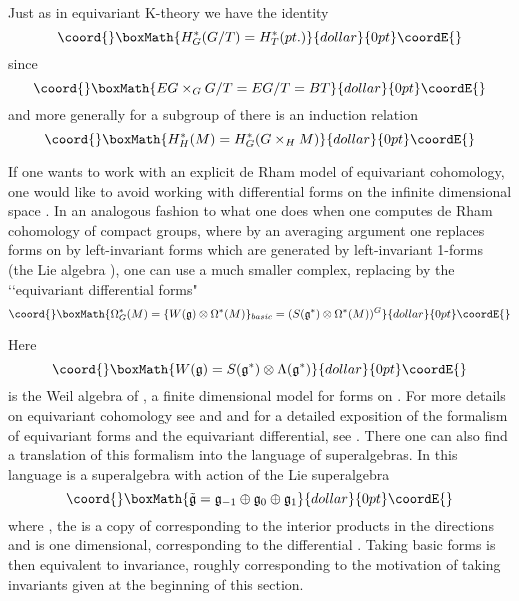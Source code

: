 \documentclass[a4paper,a4paper]{article}
\theoremstyle{conjecture}
\begin{document}
Just as in equivariant K-theory we have the identity
$$\coord{}\boxMath{H^*_G(G/T)=H^*_T(pt.)}{dollar}{0pt}\coordE{}$$
since
$$\coord{}\boxMath{EG\times_G G/T=EG/T=BT}{dollar}{0pt}\coordE{}$$
and more generally for \coordHE{} a subgroup of \coordHE{} there is an induction relation
$$\coord{}\boxMath{H^*_H(M)=H^*_G(G\times_H M)}{dollar}{0pt}\coordE{}$$

If one wants to work with an explicit de Rham model of equivariant cohomology,
one would like to avoid working with differential forms on the infinite 
dimensional space \coordHE{}.  In an analogous
fashion to what one does when one computes de Rham cohomology of
compact groups, where by an averaging argument one replaces forms
on \coordHE{} by left-invariant forms which are generated by
left-invariant 1-forms (the Lie algebra \coordHE{}), one can use a much smaller
complex, replacing \coordHE{} by the \lq\lq equivariant differential
forms"
$$\coord{}\boxMath{\Omega_G^*(M)=\{W(\mathfrak g)\otimes \Omega^*(M)\}_{basic}=
(S({\mathfrak g}^*)\otimes \Omega^*(M))^G}{dollar}{0pt}\coordE{}$$

Here 
$$\coord{}\boxMath{W({\mathfrak {g}})=S({\mathfrak g}^*)\otimes\Lambda({\mathfrak g}^*)}{dollar}{0pt}\coordE{}$$ 
is the Weil algebra of \coordHE{}, a finite dimensional model for forms on \coordHE{}.
For more details on equivariant cohomology see \cite{Atiyah-Bott} and \cite{Ginzburg}
and for
a detailed exposition of the formalism of equivariant forms and the
equivariant differential, see \cite{GS}.  There one can also find
a translation of this formalism into the language of superalgebras.  In
this language \coordHE{} is a superalgebra with action of the
Lie superalgebra
$$\coord{}\boxMath{\tilde{\mathfrak g} ={\mathfrak g}_{-1} \oplus {\mathfrak g}_0 \oplus {\mathfrak g}_1}{dollar}{0pt}\coordE{}$$
where \coordHE{}, the \coordHE{} is a copy of \coordHE{}
corresponding to the interior products in the \coordHE{} directions and \coordHE{}
is one dimensional, corresponding to the differential \coordHE{}.  Taking basic forms
is then equivalent to \coordHE{} invariance, roughly corresponding to the
motivation of taking \coordHE{} invariants given at the beginning of this section.
\end{document}
